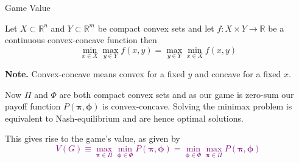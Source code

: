 \documentclass[11pt]{beamer}
\begin{document}
\begin{frame}{Game Value}

\begin{theorem}
Let $X \subset \mathbb{R}^{n}$ and $Y \subset \mathbb{R}^{m}$ be compact convex sets and let $f: X \times Y \rightarrow \mathbb{R}$ be a continuous convex-concave function then
$$\min\limits_{x \in X} \max\limits_{y \in Y} f(x,y) = \max\limits_{y \in Y} \min\limits_{x \in X} f(x,y) $$
\end{theorem}

\textbf{Note.} Convex-concave means convex for a fixed $y$ and concave for a fixed $x$.

\pause
Now $\Pi$ and $\Phi$ are both compact convex sets and as our game is zero-sum our payoff function $P(\bm{\pi},\bm{\phi})$ is convex-concave. Solving the minimax problem is equivalent to Nash-equilibrium and are hence optimal solutions.


This gives rise to the game's value, as given by \textcolor{purple}{$$V(G) \equiv \max\limits_{\bm{\pi} \in \Pi} \min\limits_{\bm{\phi} \in \Phi} P(\bm{\pi},\bm{\phi})=\min\limits_{\bm{\phi} \in \Phi} \max\limits_{\bm{\pi} \in \Pi} P(\bm{\pi},\bm{\phi})$$}
\end{frame}
\end{document}
